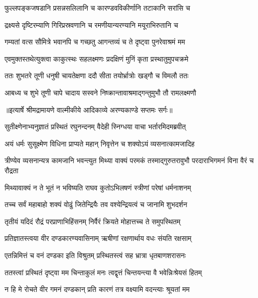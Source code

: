 \twolineshloka
{फुल्लपङ्कजषडानि प्रसन्नसलिलानि च}
{कारण्डवविकीर्णानि तटाकानि सरांसि च} %

\twolineshloka
{द्रक्ष्यसे दृष्टिरम्याणि गिरिप्रस्रवणानि च}
{रमणीयान्यरण्यानि मयूराभिरुतानि च} %

\twolineshloka
{गम्यतां वत्स सौमित्रे भवानपि च गच्छतु}
{आगन्तव्यं च ते दृष्ट्वा पुनरेवाश्रमं मम} %

\twolineshloka
{एवमुक्तस्तथेत्युक्त्वा काकुत्स्थः सहलक्ष्मणः}
{प्रदक्षिणं मुनिं कृता प्रस्थातुमुपचक्रमे} %

\twolineshloka
{ततः शुभतरे तूणी धनुषी चायतेक्षणा}
{ददौ सीता तयोर्भ्रात्रोः खड्गौ च विमलौ ततः} %

\twolineshloka
{आबध्य च शुभे तूणी चापे चादाय सस्वने}
{निष्क्रान्तावाश्रमाद्गन्तुमुभौ तौ रामलक्ष्मणौ} %


{॥इत्यार्षे श्रीमद्रामायणे वाल्मीकीये आदिकाव्ये अरण्यकाण्डे सप्तमः सर्गः॥}


\twolineshloka
{सुतीक्ष्णेनाभ्यनुज्ञातं प्रस्थितं रघुनन्दनम्}
{वैदेही स्निग्धया वाचा भर्तारमिदमब्रवीत्} %

\twolineshloka
{अयं धर्मः सुसूक्ष्मेण विधिना प्राप्यते महान्}
{निवृत्तेन च शक्योऽयं व्यसनात्कामजादिह} %

\threelineshloka
{त्रीण्येव व्यसनान्यत्र कामजानि भवन्त्युत}
{मिथ्या वाक्यं परमकं तस्माद्गुरुतरावुभौ}
{परदाराभिगमनं विना वैरं च रौद्रता} %

\twolineshloka
{मिथ्यावाक्यं न ते भूतं न भविष्यति राघव}
{कुतोऽभिलषणं स्त्रीणां परेषां धर्मनाशनम्} %

\twolineshloka
{तच्च सर्वं महाबाहो शक्यं वोढुं जितेन्द्रियैः}
{तव वश्येन्द्रियत्वं च जानामि शुभदर्शन} %

\twolineshloka
{तृतीयं यदिदं रौद्रं परप्राणाभिहिंसनम्}
{निर्वैरं क्रियते मोहात्तच्च ते समुपस्थितम्} %

\twolineshloka
{प्रतिज्ञातस्त्वया वीर दण्डकारण्यवासिनाम्}
{ऋषीणां रक्षणार्थाय वधः संयति रक्षसाम्} %

\twolineshloka
{एतन्निमित्तं च वनं दण्डका इति विश्रुतम्}
{प्रस्थितस्त्वं सह भ्रात्रा धृतबाणशरासनः} %

\twolineshloka
{ततस्त्वां प्रस्थितं दृष्ट्वा मम चिन्ताकुलं मनः}
{त्वद्वृत्तं चिन्तयन्त्या वै भवेन्निःश्रेयसं हितम्} %

\twolineshloka
{न हि मे रोचते वीर गमनं दण्डकान् प्रति}
{कारणं तत्र वक्ष्यामि वदन्त्याः श्रूयतां मम} %

